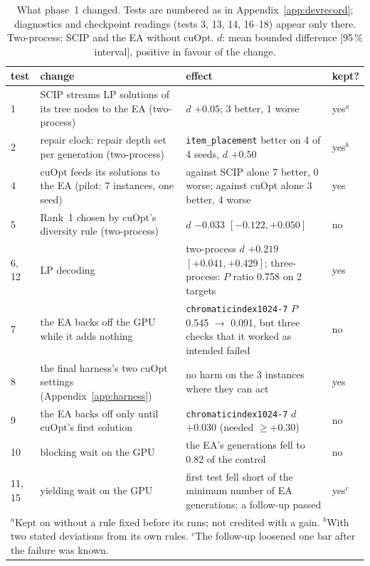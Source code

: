 \begin{table}[t]\centering\footnotesize
\caption{What phase~1 changed. Tests are numbered as in Appendix~\ref{app:devrecord}; diagnostics and checkpoint
readings (tests 3, 13, 14, 16--18) appear only there. Two-process: SCIP and the EA without cuOpt. $d$: mean bounded
difference [95\,\% interval], positive in favour of the change.}\label{tab:changes}
\setlength{\tabcolsep}{4pt}
\begin{tabular}{l>{\raggedright}p{6.3cm}>{\raggedright}p{7.2cm}l}
\toprule
test & change & effect & kept? \\
\midrule
1 & SCIP streams LP solutions of its tree nodes to the EA (two-process) & $d$ $+0.05$; 3 better, 1 worse & yes$^{a}$ \\
2 & repair clock: repair depth set per generation (two-process) & \texttt{item\_placement} better on 4 of 4 seeds, $d$ $+0.50$
  & yes$^{b}$ \\
4 & cuOpt feeds its solutions to the EA (pilot: 7 instances, one seed) & against SCIP alone 7 better, 0 worse; against
  cuOpt alone 3 better, 4 worse & yes \\
5 & Rank~1 chosen by cuOpt's diversity rule (two-process) & $d$ $-0.033$ $[-0.122, +0.050]$ & no \\
6, 12 & LP decoding & two-process $d$ $+0.219$ $[+0.041, +0.429]$; three-process: $P$ ratio 0.758 on 2 targets
  & yes \\
7 & the EA backs off the GPU while it adds nothing & \texttt{chromaticindex1024-7} $P$ 0.545 $\to$ 0.091, but three
  checks that it worked as intended failed & no \\
8 & the final harness's two cuOpt settings (Appendix~\ref{app:harness}) & no harm on the 3 instances where they can
  act & yes \\
9 & the EA backs off only until cuOpt's first solution & \texttt{chromaticindex1024-7} $d$ $+0.030$ (needed $\ge
  +0.30$) & no \\
10 & blocking wait on the GPU & the EA's generations fell to 0.82 of the control & no \\
11, 15 & yielding wait on the GPU & first test fell short of the minimum number of EA generations; a follow-up
  passed & yes$^{c}$ \\
\bottomrule
\multicolumn{4}{p{15.8cm}}{$^{a}$Kept on without a rule fixed before its runs; not credited with a gain.
$^{b}$With two stated deviations from its own rules. $^{c}$The follow-up loosened one bar after the failure was
known.}
\end{tabular}
\end{table}


